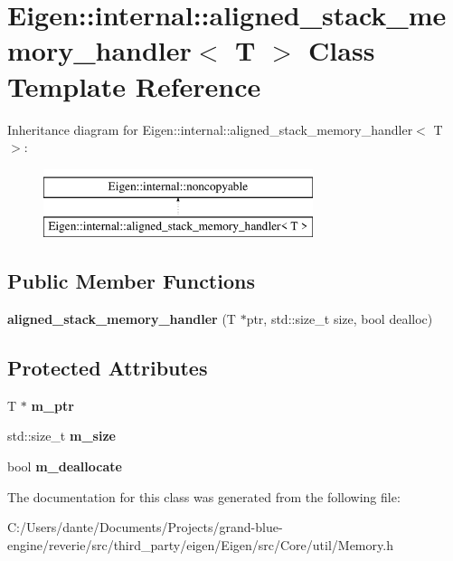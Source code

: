 \hypertarget{class_eigen_1_1internal_1_1aligned__stack__memory__handler}{}\section{Eigen\+::internal\+::aligned\+\_\+stack\+\_\+memory\+\_\+handler$<$ T $>$ Class Template Reference}
\label{class_eigen_1_1internal_1_1aligned__stack__memory__handler}
Inheritance diagram for Eigen\+::internal\+::aligned\+\_\+stack\+\_\+memory\+\_\+handler$<$ T $>$\+:\begin{figure}[H]
\begin{center}
\leavevmode
\includegraphics[height=2.000000cm]{class_eigen_1_1internal_1_1aligned__stack__memory__handler}
\end{center}
\end{figure}
\subsection*{Public Member Functions}
\begin{DoxyCompactItemize}
\item 
\mbox{\label{class_eigen_1_1internal_1_1aligned__stack__memory__handler_a6cb7f7415fdcaf5a53d214092e737200}} 
{\bfseries aligned\+\_\+stack\+\_\+memory\+\_\+handler} (T $\ast$ptr, std\+::size\+\_\+t size, bool dealloc)
\end{DoxyCompactItemize}
\subsection*{Protected Attributes}
\begin{DoxyCompactItemize}
\item 
\mbox{\label{class_eigen_1_1internal_1_1aligned__stack__memory__handler_a435d20ca546a543ff7f507d19bffdbbc}} 
T $\ast$ {\bfseries m\+\_\+ptr}
\item 
\mbox{\label{class_eigen_1_1internal_1_1aligned__stack__memory__handler_aacdeb3bdb417af342c7c871ca6cc37f8}} 
std\+::size\+\_\+t {\bfseries m\+\_\+size}
\item 
\mbox{\label{class_eigen_1_1internal_1_1aligned__stack__memory__handler_ad09991a594bdf6a44f1f05132d49cb2f}} 
bool {\bfseries m\+\_\+deallocate}
\end{DoxyCompactItemize}


The documentation for this class was generated from the following file\+:\begin{DoxyCompactItemize}
\item 
C\+:/\+Users/dante/\+Documents/\+Projects/grand-\/blue-\/engine/reverie/src/third\+\_\+party/eigen/\+Eigen/src/\+Core/util/Memory.\+h\end{DoxyCompactItemize}
